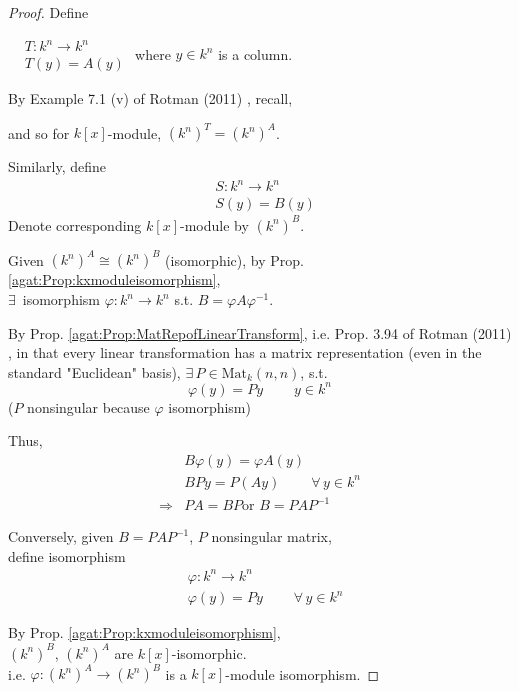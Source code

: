 \begin{proof}
	Define 
	
	$\begin{aligned} & T:k^n \to k^n \\
	& T(y) = A(y) \end{aligned}$
where $y\in k^n $ is a column.  

By Example 7.1 (v) of Rotman (2011)  \cite{agat:JRotman2010}, recall, 

and so for $k[x]$-module, $(k^n)^T = (k^n)^A$.  

Similarly, define 
\[
\begin{aligned} 
	& S: k^n \to k^n  \\
	& S(y) = B(y) 
	\end{aligned}
	\]
	Denote corresponding $k[x]$-module by $(k^n)^B$.  
	
	Given $(k^n)^A \cong (k^n)^B$ (isomorphic), by Prop. \ref{agat:Prop:kxmoduleisomorphism}, \\
	$\exists \, $ isomorphism $\varphi :k^n \to k^n$ s.t. $B=\varphi A \varphi^{-1}$.  

By Prop. \ref{agat:Prop:MatRepofLinearTransform}, i.e. Prop. 3.94 of Rotman (2011)  \cite{agat:JRotman2010}, in that every linear transformation has a matrix representation (even in the standard "Euclidean" basis), $\exists \,  P \in \text{Mat}_{k}(n,n)$, s.t. 
\[
\varphi(y) = Py \qquad \  y\in k^n
\]
($P$ nonsingular because $\varphi$ isomorphism)

Thus, 
\[
\begin{aligned}
& B\varphi(y) = \varphi A(y)  \\ 
& BPy = P(Ay) \qquad \  \forall \, y \in k^n  \\
\Longrightarrow & PA = BP \text{or } B= PAP^{-1}
\end{aligned}
\]

Conversely, given $B=PAP^{-1}$, $P$ nonsingular matrix,  \\
define isomorphism 
\[
\begin{aligned}
& \varphi :k^n \to k^n \\ 
& \varphi(y) = Py \qquad \  \forall \, y \in k^n
\end{aligned}
\]

By Prop. \ref{agat:Prop:kxmoduleisomorphism}, \\
$(k^n)^B$, $(k^n)^A$ are $k[x]$-isomorphic.  \\
i.e. $\varphi : (k^n)^A \to (k^n)^B $ is a $k[x]$-module isomorphism.  


	\end{proof}

